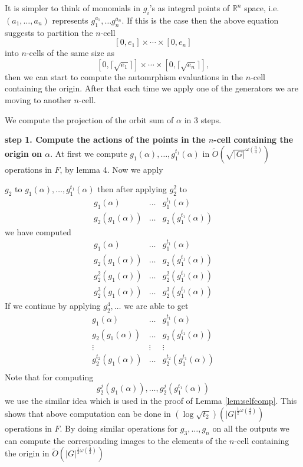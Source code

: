 \documentclass[sigconf]{acmart}
\theoremstyle{acmplain}
\begin{document}
It is simpler to think of monomials in $g_i$'s as integral points of $\mathbb{R}^n$ space, i.e.
$(a_1, \ldots , a_n)$ represents $g_1^{a_1}, \ldots g_n^{a_n}$. If this is the case then the above equation suggests to 
partition the $n$-cell $$[0,e_1] \times \cdots \times [0, e_n]$$ into $n$-cells of the same size as 
$$[0,\lceil \sqrt{e_1} \rceil] \times \cdots \times [0, \lceil \sqrt{e_n} \rceil],$$ 
then we can start to compute the automrphism evaluations in the $n$-cell containing the origin. After that each time we apply one 
of the generators we are moving to another $n$-cell.

We compute the projection of the orbit sum of $\alpha$ in 3 steps.

\textbf{step 1. Compute the actions of the points in the $n$-cell containing the origin on $\alpha$}. At first we compute 
$g_1(\alpha), \ldots , g_1^{t_1}(\alpha)$ in $\tilde{O}(\sqrt{\vert G \vert}^{\omega({\frac{3}{4}})})$ operations in $F$, by lemma 4. Now
we apply 

 $g_2$ to $g_1(\alpha), \ldots , g_1^{t_1}(\alpha)$ then after applying $g_2^2$ to
\[
 \begin{array}{lll}
 g_1(\alpha)& \ldots & g_1^{t_1}(\alpha)\\
 g_2(g_1(\alpha))& \ldots & g_2(g_1^{t_1}(\alpha)) 
\end{array} 
\]
we have computed
\[
 \begin{array}{lll}
 g_1(\alpha)& \ldots & g_1^{t_1}(\alpha)\\
 g_2(g_1(\alpha))& \ldots & g_2(g_1^{t_1}(\alpha)) \\
 g_2^2(g_1(\alpha))& \ldots & g_2^2(g_1^{t_1}(\alpha)) \\
 g_2^3(g_1(\alpha))& \ldots & g_2^3(g_1^{t_1}(\alpha))
\end{array} 
\]
If we continue by applying $g_2^4, \ldots$ we are able to get
\[
 \begin{array}{lll}
 g_1(\alpha)& \ldots & g_1^{t_1}(\alpha)\\
 g_2(g_1(\alpha))& \ldots & g_2(g_1^{t_1}(\alpha)) \\
 \vdots & \vdots & \vdots\\
 g_2^{t_2}(g_1(\alpha))& \ldots & g_2^{t_2}(g_1^{t_1}(\alpha)) \\
\end{array} 
\]
Note that for computing 
$$g_2^{j}(g_1(\alpha)), \ldots , g_2^{j}(g_1^{t_1}(\alpha))$$
we use the similar idea which is used in the proof of Lemma \ref{lem:selfcomp}.
This shows that above computation can be done in $(\log \sqrt{t_2})(\vert G \vert ^{\frac{1}{2}\omega(\frac{4}{3})})$ operations in $F$. By doing similar operations for $g_3, \ldots, g_n$ on all the outputs we can compute the corresponding images to the elements
of the $n$-cell containing the origin in $\tilde{O}(\vert G \vert ^{\frac{1}{2}\omega(\frac{4}{3})})$
\end{document}
